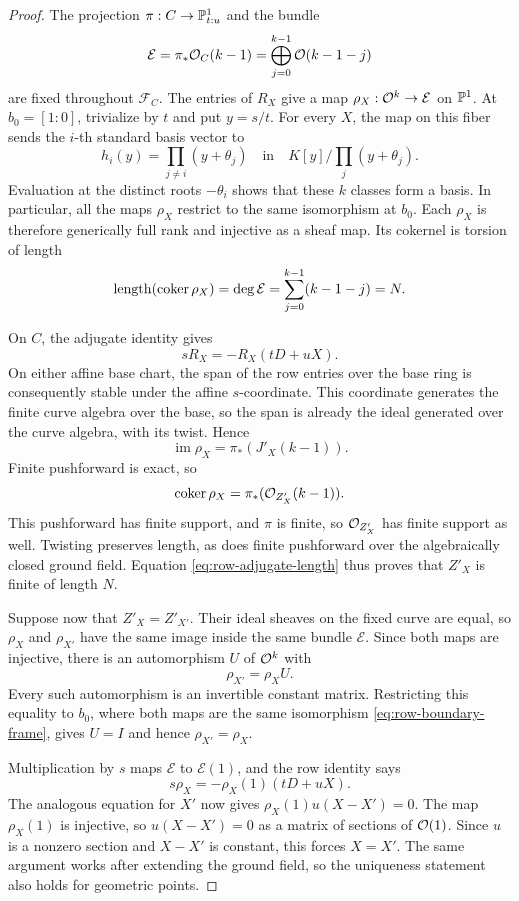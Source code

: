 \begin{proof}
The projection $\pi:C\to\mathbb P^1_{t:u}$ and the bundle
\[
 \mathcal E=\pi_*\mathcal O_C(k-1)
 =\bigoplus_{j=0}^{k-1}\mathcal O(k-1-j)
\]
are fixed throughout $\mathcal F_C$.
The entries of $R_X$ give a map
$\rho_X:\mathcal O^k\to\mathcal E$ on $\mathbb P^1$.
At $b_0=[1:0]$, trivialize by $t$ and put $y=s/t$.  For every $X$,
the map on this fiber sends the $i$-th standard basis vector to
\begin{equation}
 \label{eq:row-boundary-frame}
 h_i(y)=\prod_{j\ne i}(y+\theta_j)
 \quad\text{in}\quad
 K[y]\big/\prod_j(y+\theta_j).
\end{equation}
Evaluation at the distinct roots $-\theta_i$ shows that these $k$
classes form a basis.  In particular, all the maps $\rho_X$ restrict
to the same isomorphism at $b_0$.  Each $\rho_X$ is therefore
generically full rank and injective as a sheaf map.  Its cokernel is
torsion of length
\begin{equation}
 \label{eq:row-adjugate-length}
 \operatorname{length}(\operatorname{coker}\rho_X)
 =\deg\mathcal E
 =\sum_{j=0}^{k-1}(k-1-j)=N.
\end{equation}

On $C$, the adjugate identity gives
\[
 sR_X=-R_X(tD+uX).
\]
On either affine base chart, the span of the row entries over the base
ring is consequently stable under the affine $s$-coordinate.  This
coordinate generates the finite curve algebra over the base, so the
span is already the ideal generated over the curve algebra, with its
twist.  Hence
\[
 \operatorname{im}\rho_X=\pi_*(J'_X(k-1)).
\]
Finite pushforward is exact, so
\[
 \operatorname{coker}\rho_X=\pi_*(\mathcal O_{Z'_X}(k-1)).
\]
This pushforward has finite support, and $\pi$ is finite, so
$\mathcal O_{Z'_X}$ has finite support as well.  Twisting preserves length,
as does finite pushforward over the algebraically closed ground field.
Equation \eqref{eq:row-adjugate-length} thus proves that $Z'_X$ is
finite of length $N$.

Suppose now that $Z'_X=Z'_{X'}$.  Their ideal sheaves on the fixed
curve are equal, so $\rho_X$ and $\rho_{X'}$ have the same image inside
the same bundle $\mathcal E$.  Since both maps are injective, there is
an automorphism $U$ of $\mathcal O^k$ with
\[
 \rho_{X'}=\rho_XU.
\]
Every such automorphism is an invertible constant matrix.  Restricting
this equality to $b_0$, where both maps are the same isomorphism
\eqref{eq:row-boundary-frame}, gives $U=I$ and hence
$\rho_{X'}=\rho_X$.

Multiplication by $s$ maps $\mathcal E$ to $\mathcal E(1)$, and the
row identity says
\[
 s\rho_X=-\rho_X(1)(tD+uX).
\]
The analogous equation for $X'$ now gives
$\rho_X(1)u(X-X')=0$.  The map $\rho_X(1)$ is injective, so
$u(X-X')=0$ as a matrix of sections of $\mathcal O(1)$.  Since $u$ is a
nonzero section and $X-X'$ is constant, this forces $X=X'$.
The same argument works after extending the ground field, so the
uniqueness statement also holds for geometric points.
\end{proof}

